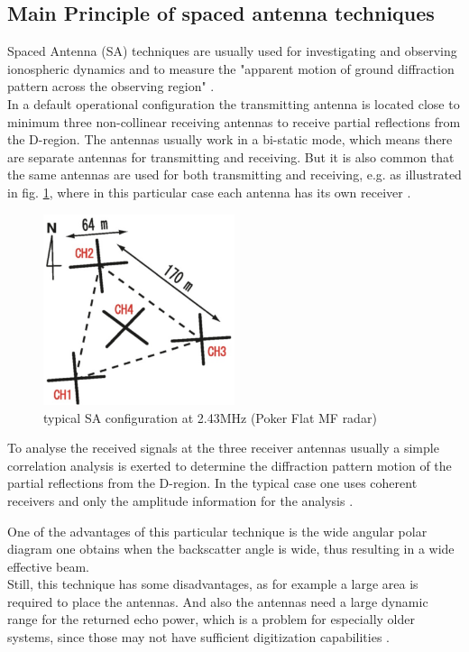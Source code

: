 \subsection{Main Principle of spaced antenna techniques}
Spaced Antenna (SA) techniques are usually used for investigating and observing ionospheric dynamics and to measure the "apparent motion of ground diffraction pattern across the observing region" \citep{reid2015mf}.\\
In a default operational configuration the transmitting antenna is located close to minimum three non-collinear receiving antennas to receive partial reflections from the D-region. The antennas usually work in a bi-static mode, which means there are separate antennas for transmitting and receiving. But it is also common that the same antennas are used for both transmitting and receiving, e.g. as illustrated in fig. \ref{fig:SAconfing}, where in this particular case each antenna has its own receiver \citep{reid2015mf}.

\begin{figure}
	\centering
	\includegraphics[width=0.5\textwidth]{images/SA_config}
	\caption{typical SA configuration at 2.43MHz (Poker Flat MF radar) \citep[c.f][Fig. 2]{reid2015mf} }
	\label{fig:SAconfing}
\end{figure}

To analyse the received signals at the three receiver antennas usually a simple correlation analysis is exerted to determine the diffraction pattern motion of the partial reflections from the D-region. In the typical case one uses coherent receivers and only the amplitude information for the analysis \citep{reid2015mf}.

One of the advantages of this particular technique is the wide angular polar diagram one obtains when the backscatter angle is wide, thus resulting in a wide effective beam.\\
Still, this technique has some disadvantages, as for example a large area is required to place the antennas. And also the antennas need a large dynamic range for the returned echo power, which is a problem for especially older systems, since those may not have sufficient digitization capabilities \citep{reid2015mf}.

